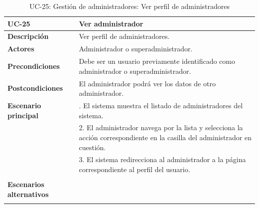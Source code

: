 \begin{table}[H]
  \begin{center}
    \begin{tabularx}{16.4cm}{|l|X|}
      \hline
      \textbf{UC-25} & \textbf{Ver administrador}\\
      \hline
      \textbf{Descripción} & Ver perfil de administradores. \\
      \hline
      \textbf{Actores} & Administrador o superadministrador.\\
      \hline
      \textbf{Precondiciones} & Debe ser un usuario previamente identificado como administrador o superadministrador.\\
      \hline
      \textbf{Postcondiciones} & El administrador podrá ver los datos de otro administrador.\\
      \hline
      \textbf{Escenario principal} & \smallskip 1. El sistema muestra el listado de administradores del sistema.\\
      & 2. El administrador navega por la lista y selecciona la acción correspondiente en la casilla del administrador en cuestión.\\
      & 3. El sistema redirecciona al administrador a la página correspondiente al perfil del usuario.\\
      & \\
      \hline
      \textbf{Escenarios alternativos} & \\
      & \\
      \hline
    \end{tabularx}
    \caption{UC-25: Gestión de administradores: Ver perfil de administradores}
    \label{tab:CU-ver-perfil-de-admin}
  \end{center}
\end{table}


